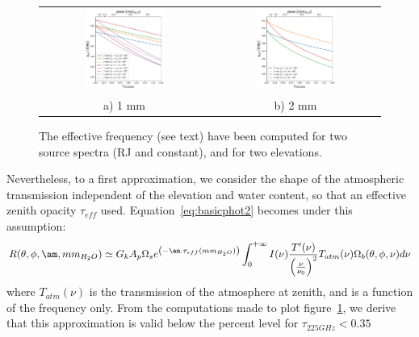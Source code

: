 \begin{figure}[h]
\begin{tabular}{cc}
\includegraphics[width=0.5\textwidth]{Figures/atm_nueff_1mm.pdf}
  & \includegraphics[width=0.5\textwidth]{Figures/atm_nueff_2mm.pdf}
  \\
a) 1 mm & b) 2 mm \\
\end{tabular}
\caption[Effective frequency as a function of the sky opacity.]{ The
  effective frequency (see text) have been computed for two source
  spectra (RJ and constant), and for two elevations.}
\label{fig:nueff}
\end{figure}

Nevertheless, to a first approximation, we consider the shape of the atmospheric
transmission independent of the elevation and water content, so that  an
effective zenith opacity $\tau_{eff}$
used. 
Equation~\ref{eq:basicphot2} becomes under this assumption: 
\begin{equation}
R(\theta, \phi, \am, mm_{H_{2}O}) \simeq G_{k}  A_{p}\Omega_{s} e^{\left(-\am
  . \tau_{eff}(mm_{H_{2}O})\right)} \int_{0}^{+\infty} I(\nu)
\frac{T'(\nu)}{\left(\frac{\nu}{\nu_{0}}\right)^{2}} T_{atm}(\nu)
\Omega_{b} (\theta, \phi, \nu) d\nu 
\label{eq:basicphot3}
\end{equation}
where $T_{atm}(\nu)$ is the transmission of the atmosphere at zenith,
and is a function of the frequency only. From the computations made to
plot figure~\ref{fig:nueff}, we derive that this approximation 
is valid below the percent level for $\tau_{225GHz} < 0.35$

